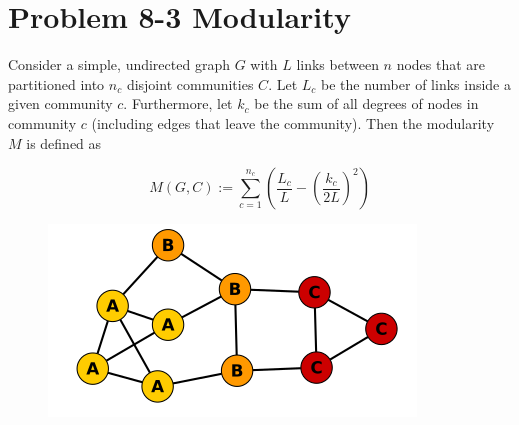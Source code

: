 \section*{Problem 8-3 Modularity}

Consider a simple, undirected graph $G$ with $L$ links between $n$ nodes that are partitioned into $n_c$ disjoint communities $C$. Let $L_c$ be the number of links inside a given community $c$. Furthermore, let $k_c$ be the sum of all degrees of nodes in community $c$ (including edges that leave the community). Then the modularity $M$ is defined as

\begin{equation}
	M(G,C) := \sum_{c=1}^{n_c} ( \frac{L_c}{L} - (\frac{k_c}{2L})^2 )
\end{equation}

\begin{figure}[h]
	\centering
	\includegraphics[width=0.4\linewidth]{content/problem3.png}
	\label{distribution}
\end{figure}


